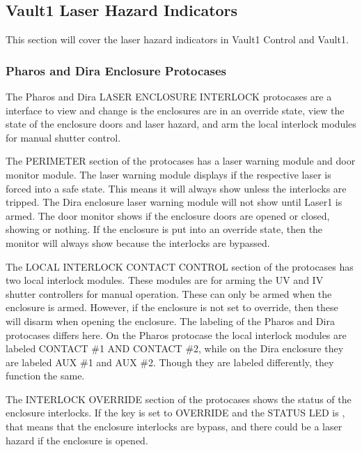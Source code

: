 \documentclass[letterpaper,10pt,english]{sphinxmanual}
\begin{document}
\subsection{Vault\sphinxhyphen{}1 Laser Hazard Indicators}
\label{\detokenize{user_documentation/Vault-1_laser:vault-1-laser-hazard-indicators}}
\sphinxAtStartPar
This section will cover the laser hazard indicators in Vault\sphinxhyphen{}1 Control and Vault\sphinxhyphen{}1.


\subsubsection{Pharos and Dira Enclosure Protocases}
\label{\detokenize{user_documentation/Vault-1_laser:pharos-and-dira-enclosure-protocases}}
\sphinxAtStartPar
The Pharos and Dira LASER ENCLOSURE INTERLOCK protocases are a interface to view and change is the enclosures are in an override state, view the state of the enclosure doors and laser hazard, and arm the local interlock modules for manual shutter control.

\sphinxAtStartPar
The PERIMETER section of the protocases has a laser warning module and door monitor module.
The laser warning module displays if the respective laser is forced into a safe state.
This means it will always show  unless the interlocks are tripped.
The Dira enclosure laser warning module will not show  until Laser\sphinxhyphen{}1 is armed.
The door monitor shows if the enclosure doors are opened or closed, showing  or nothing.
If the enclosure is put into an override state, then the monitor will always show  because the interlocks are bypassed.

\sphinxAtStartPar
The LOCAL INTERLOCK CONTACT CONTROL section of the protocases has two local interlock modules.
These modules are for arming the UV and IV shutter controllers for manual operation.
These can only be armed when the enclosure is armed.
However, if the enclosure is not set to override, then these will disarm when opening the enclosure.
The labeling of the Pharos and Dira protocases differs here.
On the Pharos protocase the local interlock modules are labeled CONTACT \#1 AND CONTACT \#2, while on the Dira enclosure they are labeled AUX \#1 and AUX \#2.
Though they are labeled differently, they function the same.

\sphinxAtStartPar
The INTERLOCK OVERRIDE section of the protocases shows the status of the enclosure interlocks.
If the key is set to OVERRIDE and the STATUS LED is , that means that the enclosure interlocks are bypass, and there could be a laser hazard if the enclosure is opened.
\end{document}
